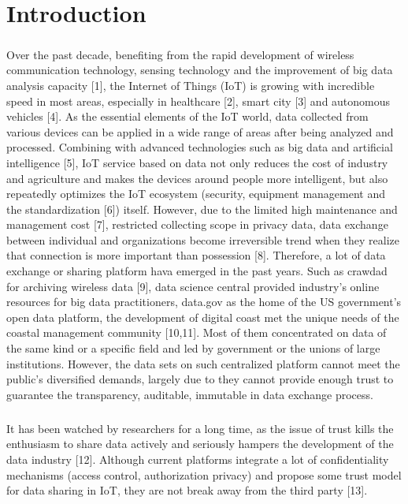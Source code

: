 
\chapter{Introduction }
\paragraph{} Over the past decade, benefiting from the rapid
development of wireless communication technology, sensing
technology and the improvement of big data analysis
capacity [1], the Internet of Things (IoT) is growing with
incredible speed in most areas, especially in healthcare [2],
smart city [3] and autonomous vehicles [4]. As the essential
elements of the IoT world, data collected from various
devices can be applied in a wide range of areas after being
analyzed and processed. Combining with advanced
technologies such as big data and artificial intelligence [5],
IoT service based on data not only reduces the cost of
industry and agriculture and makes the devices around
people more intelligent, but also repeatedly optimizes the
IoT ecosystem (security, equipment management and the
standardization [6]) itself. However, due to the limited high
maintenance and management cost [7], restricted collecting
scope in privacy data, data exchange between individual and
organizations become irreversible trend when they realize
that connection is more important than possession [8].
Therefore, a lot of data exchange or sharing platform hava
emerged in the past years. Such as crawdad for archiving
wireless data [9], data science central provided industry’s
online resources for big data practitioners, data.gov as the
home of the US government’s open data platform, the
development of digital coast met the unique needs of the
coastal management community [10,11]. Most of them
concentrated on data of the same kind or a specific field and
led by government or the unions of large institutions.
However, the data sets on such centralized platform cannot
meet the public’s diversified demands, largely due to they
cannot provide enough trust to guarantee the transparency,
auditable, immutable in data exchange process.
\paragraph{}It has been watched by researchers for a long time, as the issue of trust kills the enthusiasm to share data actively and seriously hampers the development of the data industry [12]. Although current platforms integrate a lot of confidentiality
mechanisms (access control, authorization privacy) and
propose some trust model for data sharing in IoT, they are
not break away from the third party [13].

